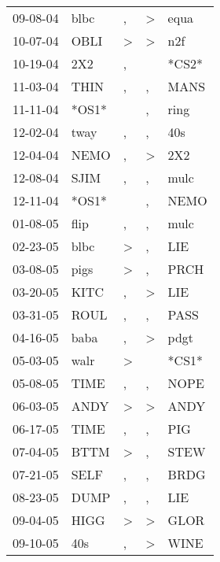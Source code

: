 \begin{supertabular}{lllll}
 09-08-04 &   blbc &                , &     \textgreater &   equa \\
 10-07-04 &   OBLI &     \textgreater &     \textgreater &    n2f \\
 10-19-04 &    2X2 &                , &                  &  *CS2* \\
 11-03-04 &   THIN &                , &                , &   MANS \\
 11-11-04 &  *OS1* &                  &                , &   ring \\
 12-02-04 &   tway &                , &                , &    40s \\
 12-04-04 &   NEMO &                , &     \textgreater &    2X2 \\
 12-08-04 &   SJIM &                , &                , &   mulc \\
 12-11-04 &  *OS1* &                  &                , &   NEMO \\
 01-08-05 &   flip &                , &                , &   mulc \\
 02-23-05 &   blbc &     \textgreater &                , &    LIE \\
 03-08-05 &   pigs &     \textgreater &                , &   PRCH \\
 03-20-05 &   KITC &                , &     \textgreater &    LIE \\
 03-31-05 &   ROUL &                , &                , &   PASS \\
 04-16-05 &   baba &                , &     \textgreater &   pdgt \\
 05-03-05 &   walr &     \textgreater &                  &  *CS1* \\
 05-08-05 &   TIME &                , &                , &   NOPE \\
 06-03-05 &   ANDY &     \textgreater &     \textgreater &   ANDY \\
 06-17-05 &   TIME &                , &                , &    PIG \\
 07-04-05 &   BTTM &     \textgreater &                , &   STEW \\
 07-21-05 &   SELF &                , &                , &   BRDG \\
 08-23-05 &   DUMP &                , &                , &    LIE \\
 09-04-05 &   HIGG &     \textgreater &     \textgreater &   GLOR \\
 09-10-05 &    40s &                , &     \textgreater &   WINE \\

\end{supertabular}
